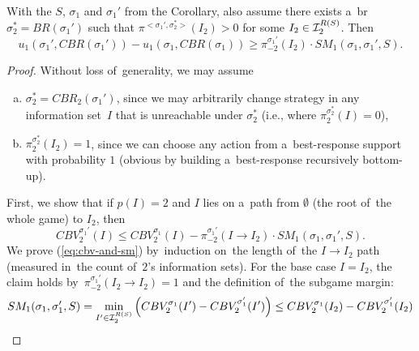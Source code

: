 \begin{thm}
  \label{thm:improvement-propto-sm}
  With the $S$, $\sigma_1$ and $\sigma_1'$ from the Corollary, also assume there exists a~\acrlong{br}~$\sigma_2^* = BR(\sigma_1')$ such that $\pi^{<\sigma_1',\sigma_2^*>} (I_2) > 0$ for some $I_2 \in\mathcal{I}_2^{R(S)}$.
  Then 
  \[
    u_1(\sigma_1', CBR(\sigma_1')) - u_1(\sigma_1, CBR(\sigma_1)) \ge \pi_{-2}^{\sigma_1'} (I_2) \cdot SM_1(\sigma_1, \sigma_1', S).
  \]
\end{thm}
\begin{proof}
  Without loss of~generality, we may assume
  \begin{enumerate}[(a)]
    \item $\sigma_2^* = CBR_2(\sigma_1')$, since we may arbitrarily change strategy in any information set~$I$ that is unreachable under $\sigma_2^*$ (i.e., where $\pi_2^{\sigma_2^*}(I) = 0$),
    \item $\pi_2^{\sigma_2^*}(I_2) = 1$, since we can choose any action from a~best-response support with probability $1$ (obvious by building a~best-response recursively bottom-up).
  \end{enumerate}
  First, we show that if $p(I) = 2$ and $I$ lies on a~path from $\emptyset$ (the root of~the whole game) to $I_2$, then
  \begin{equation}
    \label{eq:cbv-and-sm}
    CBV_2^{\sigma_1'}(I)
    \le CBV_2^{\sigma_1}(I) - \pi_{-2}^{\sigma_1'}(I \to I_2) \cdot SM_1(\sigma_1 , \sigma_1', S).
  \end{equation}
  We prove (\ref{eq:cbv-and-sm}) by~induction on~the length of~the $I \to I_2$ path (measured in~the count of~$2$'s information sets).
  For the base case $I = I_2$, the claim holds by~$\pi_{-2}^{\sigma_1'}(I_2 \to I_2) = 1$ and the definition of~the subgame margin:
  \begin{align*}
    SM_1(\sigma_1 , \sigma_1', S) = \min_{I'\in\mathcal{I}_2^{R(S)}} \left( CBV_2^{\sigma_1}(I') - CBV_2^{\sigma_1'}(I') \right) \le CBV_2^{\sigma_1}(I_2) - CBV_2^{\sigma_1'}(I_2) \\
  \end{align*}


\end{proof}
